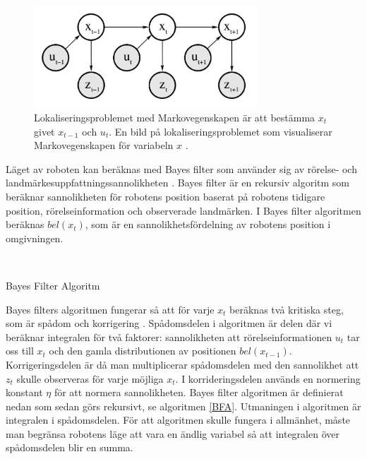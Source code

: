 \begin{figure}[ht]
    \begin{center}
    \includegraphics[width=0.75\textwidth]{markov.JPG}
    \caption{Lokaliseringsproblemet med Markovegenskapen är att bestämma $x_t$ givet $x_{t-1}$ och $u_t$. En bild på lokaliseringsproblemet som visualiserar Markovegenskapen för variabeln $x$ \citep{ProbabilisticRobotics}.}
    \label{markov}
    \end{center}
\end{figure}

Läget av roboten kan beräknas med Bayes filter som använder sig av rörelse- och landmärkesuppfattningssannolikheten \citep{ProbabilisticRobotics}. Bayes filter är en rekursiv algoritm som beräknar sannolikheten för robotens position baserat på robotens tidigare position, rörelseinformation och observerade landmärken. I Bayes filter algoritmen beräknas $bel(x_t)$, som är en sannolikhetsfördelning av robotens position i omgivningen.

\begin{algorithm}[H]
    \SetAlgoLined
    \label{BFA}
     \\
    \caption{Bayes Filter Algoritm}
\end{algorithm}

Bayes filters algoritmen fungerar så att för varje $x_t$ beräknas två kritiska steg, som är spådom och korrigering \citep{ProbabilisticRobotics}. Spådomsdelen i algoritmen är delen där vi beräknar integralen för två faktorer: sannolikheten att rörelseinformationen $u_t$ tar oss till $x_t$ och den gamla distributionen av positionen $bel(x_{t-1})$. Korrigeringsdelen är då man multiplicerar spådomsdelen med den sannolikhet att $z_t$ skulle observeras för varje möjliga $x_t$. I korrideringsdelen används en normering konstant $\eta$ för att normera sannolikheten. Bayes filter algoritmen är definierat nedan som sedan görs rekursivt, se algoritmen \ref{BFA}. Utmaningen i algoritmen är integralen i spådomsdelen. För att algoritmen skulle fungera i allmänhet, måste man begränsa robotens läge att vara en ändlig variabel så att integralen över spådomsdelen blir en summa. 

